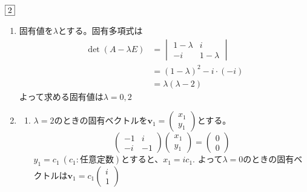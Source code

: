 \begin{souanswer} %
	$\fbox{2}$ 
\begin{enumerate}
	\item 固有値を$\lambda$とする。固有多項式は
\begin{align*}
	\det{(A- \lambda E)}
&= \begin{vmatrix}
	1- \lambda& i\\
	-i& 1- \lambda
\end{vmatrix}\\
&= (1- \lambda)^2- i\cdot (-i)\\
&= \lambda(\lambda- 2)
\end{align*}
	よって求める固有値は$\lambda= 0, 2$
	\item 
\begin{enumerate}
	\item $\lambda= 2$のときの固有ベクトルを$\bm{v}_1=\begin{pmatrix}x_1\\ y_1\end{pmatrix}$とする。
\begin{equation*}
	\begin{pmatrix}-1& i\\ -i& -1\end{pmatrix}\begin{pmatrix}x_1\\ y_1\end{pmatrix}= \begin{pmatrix}0\\ 0\end{pmatrix}
\end{equation*}
	$y_1= c_1\ (c_1\colon 任意定数)$とすると、$x_1= ic_1$.
	よって$\lambda= 0$のときの固有ベクトルは$\bm{v}_1= c_1\begin{pmatrix}i\\ 1\end{pmatrix}$


\end{enumerate}
\end{enumerate}
\end{souanswer}
